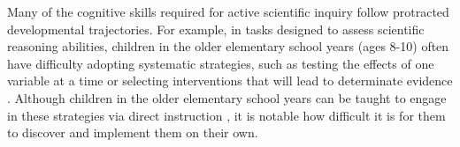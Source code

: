 \documentclass[10pt,letterpaper]{article}
\begin{document}

Many of the cognitive skills required for active scientific inquiry follow protracted 
developmental trajectories. For example, in tasks designed to assess scientific 
reasoning abilities, children in the older elementary school years (ages 8-10) often 
have difficulty adopting systematic strategies, such as testing the effects of one 
variable at a time or selecting interventions that will lead to determinate evidence 
\cite{Chen:1999}. Although children in the older elementary school years can be 
taught to engage in these strategies via direct instruction \cite{Klahr:2004,Kuhn:2005}, 
it is notable how difficult it is for them to discover and implement them on 
their own. 

\end{document}
